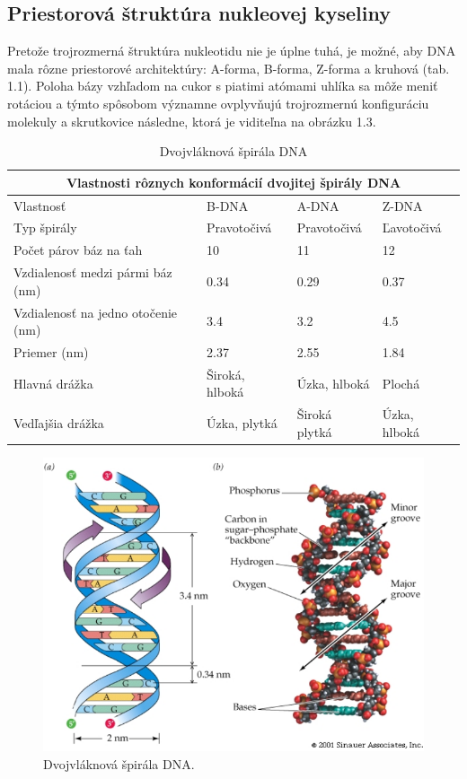 \subsection{Priestorová štruktúra nukleovej kyseliny}
Pretože trojrozmerná štruktúra nukleotidu nie je úplne tuhá, je možné, aby DNA mala rôzne priestorové architektúry:
A-forma, B-forma, Z-forma a kruhová (tab. 1.1). Poloha bázy vzhľadom na cukor s piatimi atómami uhlíka sa môže meniť rotáciou
a týmto spôsobom významne ovplyvňujú trojrozmernú konfiguráciu molekuly a skrutkovice následne, ktorá je viditeľna na obrázku 1.3.
\begin{table}[!ht]
	\caption{Dvojvláknová špirála DNA}\label{t:1}
	\smallskip
	\centering
	
	\begin{tabular}{ |p{3cm}||p{3cm}|p{3cm}|p{3cm}|  }
		\hline
		\multicolumn{4}{|c|}{Vlastnosti rôznych konformácií dvojitej špirály DNA} \\
		\hline
		Vlastnosť& B-DNA & A-DNA & Z-DNA\\
		\hline
		\hline
		Typ špirály & Pravotočivá & Pravotočivá & Ľavotočivá \\
		\hline
		Počet párov báz na ťah & 10 & 11 & 12\\
		\hline
		Vzdialenosť medzi pármi báz (nm) & 0.34 & 0.29 & 0.37\\
		\hline
		Vzdialenosť na jedno otočenie (nm) & 3.4 & 3.2 & 4.5\\
		\hline
		Priemer (nm) & 2.37 & 2.55 & 1.84\\
		\hline
		Hlavná drážka & Široká, hlboká & Úzka, hlboká & Plochá\\
		\hline
		Vedľajšia drážka & Úzka, plytká & Široká plytká & Úzka, hlboká\\
		\hline
	\end{tabular}
\end{table}

\begin{figure}[!ht]
	\centering
	\includegraphics[width=.8\textwidth]{figures/spatial.png}
	\caption{Dvojvláknová špirála DNA.\label{o:latex_friendly_zone}}
\end{figure}

